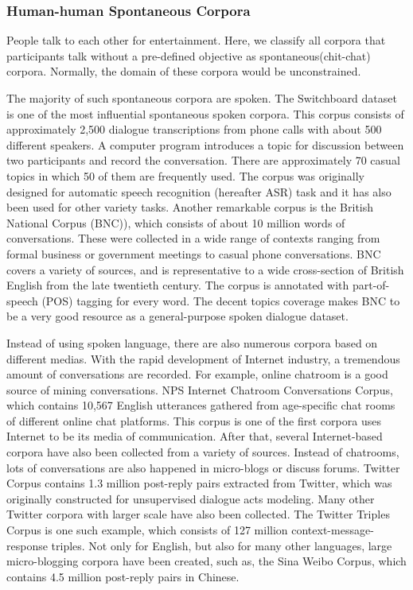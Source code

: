 \documentclass[bsc,frontabs,twoside,singlespacing,parskip,deptreport]{infthesis}     %
\begin{document}
\subsubsection*{Human-human Spontaneous Corpora}

People talk to each other for entertainment. Here, we classify all corpora that participants talk without a pre-defined objective as spontaneous(chit-chat) corpora. Normally, the domain of these corpora would be unconstrained.

The majority of such spontaneous corpora are spoken. The Switchboard dataset\cite{godfrey1992switchboard} is one of the most influential spontaneous spoken corpora. This corpus consists of approximately 2,500 dialogue transcriptions from phone calls with about 500 different speakers. A computer program introduces a topic for discussion between two participants and record the conversation. There are approximately 70 casual topics in which 50 of them are frequently used. The corpus was originally designed for automatic speech recognition (hereafter ASR) task and it has also been used for other variety tasks. Another remarkable corpus is the British National Corpus (BNC)\cite{leech1992100}), which consists of about 10 million words of conversations. These were collected in a wide range of contexts ranging from formal business or government meetings to casual phone conversations. BNC covers a variety of sources, and is representative to a wide cross-section of British English from the late twentieth century. The corpus is annotated with part-of-speech (POS) tagging for every word. The decent topics coverage makes BNC to be a very good resource as a general-purpose spoken dialogue dataset.

Instead of using spoken language, there are also numerous corpora based on different medias. With the rapid development of Internet industry, a tremendous amount of conversations are recorded. For example, online chatroom is a good source of mining conversations. NPS Internet Chatroom Conversations Corpus\cite{forsythand2007lexical}, which contains 10,567 English utterances gathered from age-specific chat rooms of different online chat platforms. This corpus is one of the first corpora uses Internet to be its media of communication. After that, several Internet-based corpora have also been collected from a variety of sources. Instead of chatrooms, lots of conversations are also happened in micro-blogs or discuss forums. Twitter Corpus\cite{ritter2010unsupervised} contains 1.3 million post-reply pairs extracted from Twitter, which was originally constructed for unsupervised dialogue acts modeling. Many other Twitter corpora with larger scale have also been collected. The Twitter Triples Corpus\cite{sordoni2015neural} is one such example, which consists of 127 million context-message-response triples. Not only for English, but also for many other languages, large micro-blogging corpora have been created, such as, the Sina Weibo Corpus\cite{shang2015neural}, which contains 4.5 million post-reply pairs in Chinese.
\end{document}
